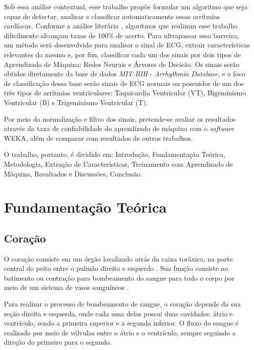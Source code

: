 \documentclass[conference]{IEEEtran}
\begin{document}
Sob essa análise contextual, esse trabalho propõe formular um algoritmo que seja capaz de detectar, analisar e classificar automaticamente essas arritmias cardíacas. Conforme a análise literária \cite{beckert09}, algoritmos que realizam esse trabalho dificilmente alcançam taxas de 100\% de acerto. Para ultrapassar essa barreira, um método será desenvolvido para analisar o sinal de ECG, extrair características relevantes do mesmo e, por fim, classificar cada um dos sinais por dois tipos de Aprendizado de Máquina: Redes Neurais e Árvores de Decisão. Os sinais serão obtidos diretamente da base de dados \textit{MIT-BIH} - \textit{Arrhythmia Database}, e o foco de classificação dessa base serão sinais de ECG normais ou possuidor de um dos três tipos de arritmias ventriculares: Taquicardia Ventricular (VT), Bigeminismo Ventricular (B) e Trigeminismo Ventricular (T).

Por meio da normalização e filtro dos sinais, pretende-se avaliar os resultados através da taxa de confiabilidade do aprendizado de máquina com o \textit{software} WEKA, além de comparar com resultados de outros trabalhos. 

O trabalho, portanto, é dividido em: Introdução, Fundamentação Teórica, Metodologia, Extração de Características, Treinamento com Aprendizado de Máquina, Resultados e Discussões, Conclusão.

 

\section{Fundamentação Teórica}

\subsection{Coração}

O coração consiste em um órgão localizado atrás da caixa toráxica, na parte central do peito entre o pulmão direito e esquerdo \cite{nih11}. Sua função consiste no batimento ou contração para bombeamento do sangue para todo o corpo por meio de um sistema de vasos sanguíneos \cite{gray79}.

Para realizar o processo de bombeamento de sangue, o coração depende da sua seção direita e esquerda, onde cada uma delas possui duas cavidades: átrio e ventrículo, sendo a primeira superior e a segunda inferior. O fluxo do sangue é realizado por meio de válvulas entre o átrio e o ventrículo, sempre seguindo a direção do primeiro para o segundo.
\end{document}
